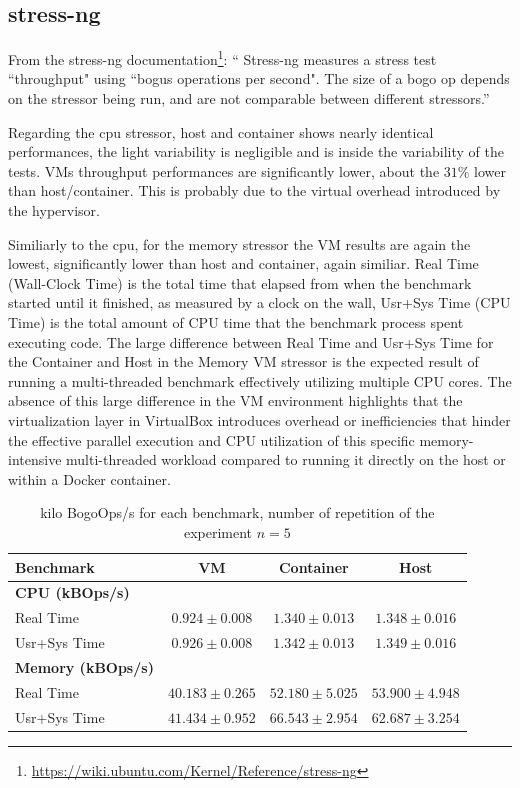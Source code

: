 \subsection{stress-ng}

From the stress-ng documentation\footnote{\url{https://wiki.ubuntu.com/Kernel/Reference/stress-ng}}: `` Stress-ng measures a stress test ``throughput" using ``bogus operations per second". The size of a bogo op depends on the stressor being run, and are not comparable between different stressors.''

Regarding the cpu stressor, host and container shows nearly identical performances, the light variability is negligible and is inside the variability of the tests. VMs throughput performances are significantly lower, about the $31\%$ lower than host/container. This is probably due to the virtual overhead introduced by the hypervisor.

Similiarly to the cpu, for the memory stressor the VM results are again the lowest, significantly lower than host and container, again similiar. 
Real Time (Wall-Clock Time) is the total time that elapsed from when the benchmark started until it finished, as measured by a clock on the wall, Usr+Sys Time (CPU Time) is the total amount of CPU time that the benchmark process spent executing code.
The large difference between Real Time and Usr+Sys Time for the Container and Host in the Memory VM stressor is the expected result of running a multi-threaded benchmark effectively utilizing multiple CPU cores. The absence of this large difference in the VM environment highlights that the virtualization layer in VirtualBox introduces overhead or inefficiencies that hinder the effective parallel execution and CPU utilization of this specific memory-intensive multi-threaded workload compared to running it directly on the host or within a Docker container.

\begin{table}[H]
    \centering
    \begin{tabular}{lccc}
    \toprule
    \textbf{Benchmark} & \textbf{VM} & \textbf{Container} & \textbf{Host} \\
    \midrule
    \textbf{CPU (kBOps/s)} & & & \\
    Real Time & $0.924 \pm 0.008$ & $1.340 \pm 0.013$ & $1.348 \pm 0.016$ \\
    Usr+Sys Time & $0.926 \pm 0.008$ & $1.342 \pm 0.013$ & $1.349 \pm 0.016$ \\
    \midrule
    \textbf{Memory (kBOps/s)} & & & \\
    Real Time & $40.183 \pm 0.265$ & $52.180 \pm 5.025$ & $53.900 \pm 4.948$ \\
    Usr+Sys Time & $41.434 \pm 0.952$ & $66.543 \pm 2.954$ & $62.687 \pm 3.254$ \\
    \bottomrule
    \end{tabular}
    \caption{kilo BogoOps/s for each benchmark, number of repetition of the experiment $n=5$}
    \label{tab:stress-ng}
\end{table}
